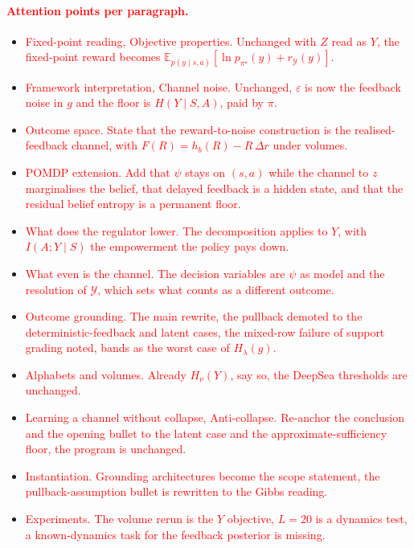 \documentclass[10pt]{article}
\newcommand{\add}[1]{\textcolor{red}{#1}}
\begin{document}
\paragraph{\add{Attention points per paragraph.}}
\begin{itemize}
  \item \add{Fixed-point reading, Objective properties. Unchanged with $Z$ read as $Y$, the fixed-point reward becomes $\mathbb E_{p(y \mid s,a)}[\ln p_{\pi^\star}(y) + r_{\mathcal Y}(y)]$.}
  \item \add{Framework interpretation, Channel noise. Unchanged, $\varepsilon$ is now the feedback noise in $g$ and the floor is $H(Y \mid S,A)$, paid by $\pi$.}
  \item \add{Outcome space. State that the reward-to-noise construction is the realised-feedback channel, with $F(R) = h_b(R) - R\,\Delta r$ under volumes.}
  \item \add{POMDP extension. Add that $\psi$ stays on $(s,a)$ while the channel to $z$ marginalises the belief, that delayed feedback is a hidden state, and that the residual belief entropy is a permanent floor.}
  \item \add{What does the regulator lower. The decomposition applies to $Y$, with $I(A;Y \mid S)$ the empowerment the policy pays down.}
  \item \add{What even is the channel. The decision variables are $\psi$ as model and the resolution of $\mathcal Y$, which sets what counts as a different outcome.}
  \item \add{Outcome grounding. The main rewrite, the pullback demoted to the deterministic-feedback and latent cases, the mixed-row failure of support grading noted, bands as the worst case of $H_\lambda(g)$.}
  \item \add{Alphabets and volumes. Already $H_\nu(Y)$, say so, the DeepSea thresholds are unchanged.}
  \item \add{Learning a channel without collapse, Anti-collapse. Re-anchor the conclusion and the opening bullet to the latent case and the approximate-sufficiency floor, the program is unchanged.}
  \item \add{Instantiation. Grounding architectures become the scope statement, the pullback-assumption bullet is rewritten to the Gibbs reading.}
  \item \add{Experiments. The volume rerun is the $Y$ objective, $L = 20$ is a dynamics test, a known-dynamics task for the feedback posterior is missing.}
\end{itemize}
\end{document}
